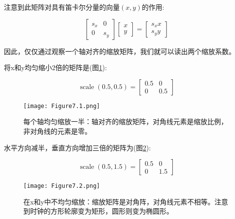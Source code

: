注意到此矩阵对具有笛卡尔分量的向量$(x,y)$的作用:

\begin{equation}
	\left[\begin{array}{cc}
		s_x & 0 \\
		0 & s_y
	\end{array}\right]\left[\begin{array}{l}
		x \\
		y
	\end{array}\right]=\left[\begin{array}{l}
		s_x x \\
		s_y y
	\end{array}\right]
\nonumber
\end{equation}

因此，仅仅通过观察一个轴对齐的缩放矩阵，我们就可以读出两个缩放系数。

\begin{example}
	将x和y均匀缩小2倍的矩阵是(图\ref{fig:7.1}):
	
	\begin{equation}
		\operatorname{scale}\left(0.5, 0.5 \right)=\left[\begin{array}{cc}
			0.5 & 0 \\
			0 & 0.5
		\end{array}\right]
		\nonumber
	\end{equation}

\begin{figure}[htbp]
	\centering
	\texttt{[image: Figure7.1.png]}
	\caption{每个轴均匀缩放一半：轴对齐的缩放矩阵，对角线元素是缩放比例，非对角线的元素是零。}
	\label{fig:7.1}
\end{figure}

水平方向减半，垂直方向增加三倍的矩阵为(图\ref{fig:7.2}):

	\begin{equation}
		\operatorname{scale}\left(0.5, 1.5 \right)=\left[\begin{array}{cc}
			0.5 & 0 \\
			0 & 1.5
		\end{array}\right]
		\nonumber
	\end{equation}

\begin{figure}[htbp]
	\centering
	\texttt{[image: Figure7.2.png]}
	\caption{在x和y中不均匀缩放：缩放矩阵是对角阵，对角线元素不相等。注意到时钟的方形轮廓变为矩形，圆形则变为椭圆形。}
	\label{fig:7.2}
\end{figure}

\end{example}

